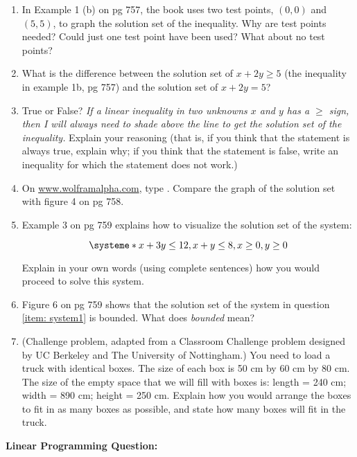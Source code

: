 \documentclass[12pt,dvipsnames]{article}
\begin{document}
\begin{enumerate}[label=$\blacktriangleright$ {\bf  \arabic*:}]
	\item In Example  1 (b) on pg 757, the book uses two test points, $(0,0)$ and $(5,5)$, to graph the solution set of the inequality. Why are test points needed? Could just one test point have been used? What about no test points?
	\item What is the difference between the solution set of $x+2y\geq 5$ (the inequality in example 1b, pg 757) and the solution set of $x+2y=5$?
	\item True or False? {\emph{If a linear inequality in two unknowns $x$ and $y$ has a $\geq$ sign, then I will always need to shade above the line to get the solution set of the inequality.}} Explain your reasoning (that is, if you think that the statement is always true, explain why; if you think that the statement is false, write an inequality for which the statement does not work.)
	\item On {\url{www.wolframalpha.com}}, type {}. Compare the graph of the solution set with figure 4 on pg 758.
	\item \label{item: system1} Example 3 on pg 759 explains how to visualize the solution set of the system:
	
		\[
	\systeme*{x+3y \leq 12, x+y \leq 8, x \geq 0, y  \geq 0}
	\]

Explain in your own words (using complete sentences) how you would proceed to solve this system.

\item Figure 6 on pg 759 shows that the solution set of the system in question \ref{item: system1} is bounded. What does {\emph{bounded}} mean? 


\item %
(Challenge problem, adapted from a Classroom Challenge problem designed by UC Berkeley and The University of Nottingham.) You need to load a truck with identical boxes. The size of each box is 50 cm by 60 cm by 80 cm. The size of the empty space that we will fill with boxes is: length = 240 cm; width =  890 cm; height = 250 cm. Explain how you would arrange the boxes to fit in as many boxes as possible, and state how many boxes will fit in the truck.

\end{enumerate}
{\large{\bfseries{Linear Programming  Question:} }}
\end{document}
